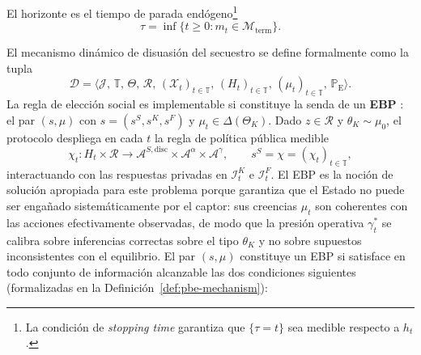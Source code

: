 \documentclass[12pt]{article}
\providecommand{\textcite}{\citet}
\theoremstyle{definition}
\theoremstyle{remark}
\newcommand{\ProbE}{\mathbb{P}_{\mathrm{E}}}
\newcommand{\1}{\mathbf{1}}
\begin{document}
El horizonte es el tiempo de parada endógeno\footnote{La condición de \textit{stopping time} garantiza que $\{\tau=t\}$ sea medible respecto a $h_t$.}
\begin{equation}
\label{eq:stopping-time}
\tau = \inf \{ t \geq 0 : m_t \in \mathcal{M}_{\mathrm{term}} \}.
\end{equation}



El mecanismo dinámico de disuasión del secuestro se define formalmente como la tupla
\begin{equation*}
\mathcal{D} = \bigl\langle \mathcal{J},\, \mathbb{T},\, \Theta,\, \mathcal{R},\, (\mathcal{X}_t)_{t \in \mathbb{T}},\, (H_t)_{t \in \mathbb{T}},\, (\mu_t)_{t \in \mathbb{T}},\, \ProbE \bigr\rangle.
\end{equation*}
\noindent La regla de elección social es implementable si constituye la senda de un \textbf{EBP} \textcite{FudenbergTirole1991}: el par $(s,\mu)$ con $s=(s^S,s^K,s^F)$ y $\mu_t\in\Delta(\Theta_K)$. Dado $z\in\mathcal{R}$ y $\theta_K\sim\mu_0$, el protocolo despliega en cada $t$ la regla de política pública medible
\[
\chi_t \colon H_t\times\mathcal{R} \longrightarrow \mathcal{A}^{S,\text{disc}} \times \mathcal{A}^{\alpha} \times \mathcal{A}^{\gamma}, \qquad s^S = \chi = (\chi_t)_{t\in\mathbb{T}},
\]
interactuando con las respuestas privadas en $\mathcal{I}_t^K$ e $\mathcal{I}_t^F$. El EBP es la noción de solución apropiada para este problema porque garantiza que el Estado no puede ser engañado sistemáticamente por el captor: sus creencias $\mu_t$ son coherentes con las acciones efectivamente observadas, de modo que la presión operativa $\gamma_t^\ast$ se calibra sobre inferencias correctas sobre el tipo $\theta_K$ y no sobre supuestos inconsistentes con el equilibrio. El par $(s,\mu)$ constituye un EBP si satisface en todo conjunto de información alcanzable las dos condiciones siguientes \textup{(}formalizadas en la Definición~\ref{def:pbe-mechanism}\textup{)}:
\end{document}
